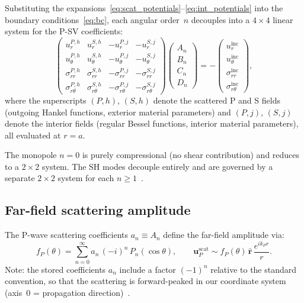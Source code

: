 \documentclass[11pt,a4paper]{article}
\newcommand{\bu}{\mathbf{u}}
\begin{document}
Substituting the expansions~\eqref{eq:scat_potentials}--\eqref{eq:int_potentials}
into the boundary conditions~\eqref{eq:bc}, each angular order~$n$ decouples
into a $4 \times 4$ linear system for the P-SV coefficients:
\begin{equation}
  \begin{pmatrix}
    u_r^{P,h} & u_r^{S,h} & -u_r^{P,j} & -u_r^{S,j} \\[3pt]
    u_\theta^{P,h} & u_\theta^{S,h} & -u_\theta^{P,j} & -u_\theta^{S,j} \\[3pt]
    \sigma_{rr}^{P,h} & \sigma_{rr}^{S,h} & -\sigma_{rr}^{P,j} & -\sigma_{rr}^{S,j} \\[3pt]
    \sigma_{r\theta}^{P,h} & \sigma_{r\theta}^{S,h} & -\sigma_{r\theta}^{P,j} & -\sigma_{r\theta}^{S,j}
  \end{pmatrix}
  \begin{pmatrix} A_n \\ B_n \\ C_n \\ D_n \end{pmatrix}
  = -\begin{pmatrix} u_r^\text{inc} \\ u_\theta^\text{inc} \\
      \sigma_{rr}^\text{inc} \\ \sigma_{r\theta}^\text{inc} \end{pmatrix},
  \label{eq:mie_4x4}
\end{equation}
where the superscripts $(P,h)$, $(S,h)$ denote the scattered P and
S fields (outgoing Hankel functions, exterior material parameters) and
$(P,j)$, $(S,j)$ denote the interior fields (regular Bessel functions,
interior material parameters), all evaluated at $r = a$.

The monopole $n = 0$ is purely compressional (no shear contribution)
and reduces to a $2 \times 2$ system.  The SH modes decouple entirely
and are governed by a separate $2 \times 2$ system for each
$n \geq 1$~\cite{PaoMow1973}.

\subsection{Far-field scattering amplitude}

The P-wave scattering coefficients $a_n \equiv A_n$ define the
far-field amplitude via:
\begin{equation}
  f_P(\theta) = \sum_{n=0}^{\infty} a_n\,(-i)^n\,P_n(\cos\theta),
  \qquad
  \bu_P^\text{scat} \sim f_P(\theta)\,\hat{\mathbf{r}}\,
    \frac{e^{ik_P r}}{r}.
  \label{eq:farfield}
\end{equation}
Note: the stored coefficients $a_n$ include a factor $(-1)^n$ relative
to the standard convention, so that the scattering is forward-peaked
in our coordinate system (axis~0 = propagation
direction)~\cite{KorneevJohnson1993}.
\end{document}

